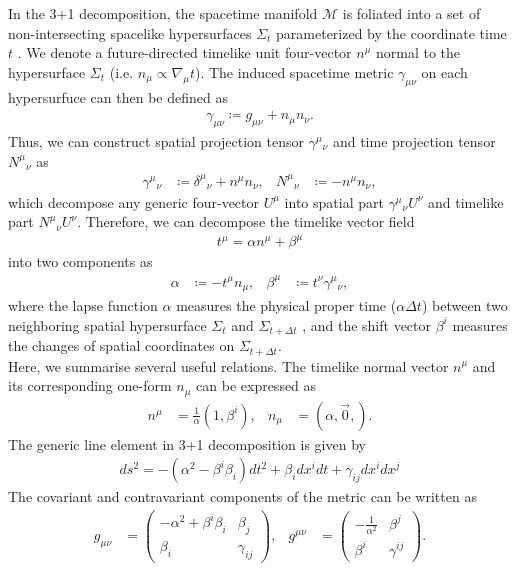 In the 3+1 decomposition, the spacetime manifold $\mathcal{M}$ is foliated into a set of non-intersecting spacelike hypersurfaces $\Sigma_t$ parameterized by the coordinate time $t$ \cite{misner1973gravitation}.
We denote a future-directed timelike unit four-vector $n^\mu$ normal to the hypersurface $\Sigma_t$ (i.e. $n_{\mu} \propto \nabla_\mu t$).
The induced spacetime metric $\gamma_{\mu\nu}$ on each hypersurfuce can then be defined as
\begin{align}\label{eq:2.2.spatial}
    \gamma_{\mu\nu} \coloneqq g_{\mu\nu} + n_{\mu} n_{\nu}.
\end{align}
Thus, we can construct spatial projection tensor $\gamma^{\mu}{}_{\nu}$ and time projection tensor $N^{\mu}{}_{\nu}$ as
\begin{align}
    \gamma^{\mu}{}_{\nu} &\coloneqq \delta^{\mu}{}_{\nu} + n^{\mu} n_{\nu}, & N^{\mu}{}_{\nu} &\coloneqq - n^{\mu} n_{\nu},
\end{align}
which decompose any generic four-vector $U^\mu$ into spatial part $\gamma^{\mu}{}_{\nu}U^{\nu}$ and timelike part $N^{\mu}{}_{\nu}U^{\nu}$.
Therefore, we can decompose the timelike vector field
\begin{align}\label{eq:2.2.1.normal_decompose}
t^\mu = \alpha n^{\mu} + \beta^{\mu}
\end{align}
into two components as
\begin{align}
    \alpha &\coloneqq - t^\mu n_\mu, & \beta^{\mu} &\coloneqq t^{\nu} \gamma^{\mu}{}_{\nu},
\end{align}
where the lapse function $\alpha$ measures the physical proper time ($\alpha\Delta t$) between two neighboring spatial hypersurface $\Sigma_t$ and $\Sigma_{t+\Delta t}$
, and the shift vector $\beta^i$ measures the changes of spatial coordinates on $\Sigma_{t+\Delta t}$.\\
Here, we summarise several useful relations.
The timelike normal vector $n^\mu$ and its corresponding one-form $n_\mu$ can be expressed as
\begin{align} \label{eq:2.2.1.normal}
    n^\mu &= \frac{1}{\alpha}\left(1, \beta^i \right), & n_\mu &= \left(\alpha, \vec{0}, \right).
\end{align}
The generic line element in 3+1 decomposition is given by
\begin{align}
    ds^2 = - \left( \alpha^2 - \beta^i \beta_i \right) dt^2 + \beta_i dx^i dt + \gamma_{ij} dx^i dx^j
\end{align}
The covariant and contravariant components of the metric can be written as
\begin{align}\label{eq:2.2.1.g}
    g_{\mu\nu} &= 
    \begin{pmatrix}
        - \alpha^2 + \beta^i \beta_i & \beta_j \\
        \beta_i & \gamma_{ij}
    \end{pmatrix}, &
    g^{\mu\nu} &= 
    \begin{pmatrix}
        - \frac{1}{\alpha^2} & \beta^j \\
        \beta^i & \gamma^{ij}
    \end{pmatrix}.
\end{align}
